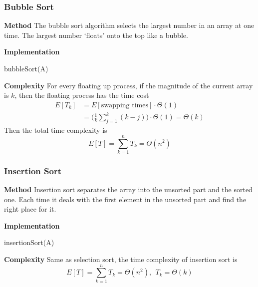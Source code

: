 \documentclass[11pt]{article}
\begin{document}
\subsubsection{Bubble Sort}
\noindent \textbf{Method} The bubble sort algorithm selects the largest number in an array at one time. The largest number `floats' onto the top like a bubble. \par \noindent 
\textbf{Implementation} 
\begin{algorithm}
    \caption{bubbleSort(A)}
    \label{bubSort}
    \begin{algorithmic}
        \ENDIF
        \ENDFOR
        \ENDFOR
    \end{algorithmic}
\end{algorithm} \par \noindent
\textbf{Complexity} For every floating up process, if the magnitude of the current array is $k$, then the floating process has the time cost
\begin{equation}
\begin{aligned}
    E[T_k] &= E[\text{swapping times}]\cdot\Theta(1)\\
    &= \bigg(\frac{1}{k}\sum_{j=1}^{k}(k-j)\bigg)\cdot \Theta(1)= \Theta(k)
\end{aligned}
\end{equation}
Then the total time complexity is
\begin{equation}
    E[T] = \sum_{k=1}^{n}T_k = \Theta(n^2)
\end{equation}
\subsubsection{Insertion Sort}
\noindent \textbf{Method} Insertion sort separates the array into the unsorted part and the sorted one. Each time it deals with the first element in the unsorted part and find the right place for it. \par \noindent 
\textbf{Implementation}
\begin{algorithm}
    \caption{insertionSort(A)}
    \label{insSort}
    \begin{algorithmic}
        \ENDWHILE
        \ENDFOR
    \end{algorithmic}
\end{algorithm} \par \noindent 
\textbf{Complexity}
Same as selection sort, the time complexity of insertion sort is
\begin{equation}
    E[T] = \sum_{k=1}^n T_k = \Theta(n^2),~~T_k = \Theta(k)
\end{equation}
\end{document}

